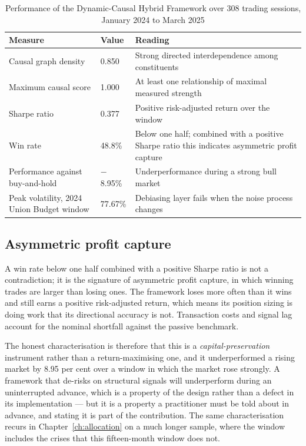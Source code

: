 \begin{table}[!htb]
\centering
\caption[Performance of the Dynamic-Causal Hybrid Framework]{Performance of the Dynamic-Causal
Hybrid Framework over 308 trading sessions, January 2024 to March 2025}
\label{tab:dchf-perf}
\tabfont
\begin{tabular}{@{}L{6.4cm}L{3.0cm}L{4.6cm}@{}}
\toprule
\textbf{Measure} & \textbf{Value} & \textbf{Reading} \\
\midrule
Causal graph density & 0.850 & Strong directed interdependence among constituents \\
Maximum causal score & 1.000 & At least one relationship of maximal measured strength \\
Sharpe ratio & 0.377 & Positive risk-adjusted return over the window \\
Win rate & 48.8\% & Below one half; combined with a positive Sharpe ratio this indicates
asymmetric profit capture \\
Performance against buy-and-hold & $-$8.95\% & Underperformance during a strong bull market \\
Peak volatility, 2024 Union Budget window & 77.67\% & Debiasing layer fails when the noise
process changes \\
\bottomrule
\end{tabular}
\end{table}

\subsection{Asymmetric profit capture}

A win rate below one half combined with a positive Sharpe ratio is not a contradiction; it is the
signature of asymmetric profit capture, in which winning trades are larger than losing ones. The
framework loses more often than it wins and still earns a positive risk-adjusted return, which
means its position sizing is doing work that its directional accuracy is not. Transaction costs
and signal lag account for the nominal shortfall against the passive benchmark.

The honest characterisation is therefore that this is a \emph{capital-preservation} instrument
rather than a return-maximising one, and it underperformed a rising market by 8.95 per cent over a
window in which the market rose strongly. A framework that de-risks on structural signals will
underperform during an uninterrupted advance, which is a property of the design rather than a
defect in its implementation --- but it is a property a practitioner must be told about in
advance, and stating it is part of the contribution. The same characterisation recurs in
Chapter~\ref{ch:allocation} on a much longer sample, where the window includes the crises that
this fifteen-month window does not.

